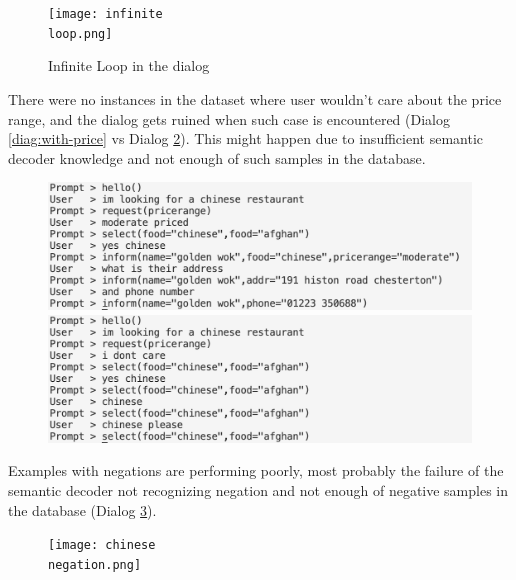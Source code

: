 \documentclass[12pt,titlepage,a4paper]{article}
\begin{document}
\begin{figure}[!htb]
    \renewcommand\figurename{Dialog}
    \centering
    \texttt{[image: infinite\\ loop.png]}
    \caption{Infinite Loop in the dialog}
    \label{diag:loop}
\end{figure}

There were no instances in the dataset where user wouldn't care about the price range, and the dialog gets ruined when such case is encountered (Dialog \ref{diag:with-price} vs Dialog \ref{diag:without-price}). This might happen due to insufficient semantic decoder knowledge and not enough of such samples in the database.

\begin{figure}[!htb]
    \renewcommand\figurename{Dialog}
      \includegraphics[width=\linewidth]{with_price.png}
      \caption{}
      \label{diag:with-price}
    \endminipage\hfill
      \includegraphics[width=\linewidth]{without_price.png}
      \caption{}
      \label{diag:without-price}
    \endminipage
\end{figure}

Examples with negations are performing poorly, most probably the failure of the semantic decoder not recognizing negation and not enough of negative samples in the database (Dialog \ref{diag:negation}).

\begin{figure}[!htb]
    \renewcommand\figurename{Dialog}
    \centering
    \texttt{[image: chinese\\ negation.png]}
    \caption{}
    \label{diag:negation}
\end{figure}
\end{document}
